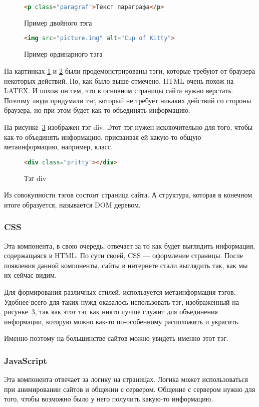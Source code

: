 \begin{figure}
    \begin{lstlisting}[language=html]
        <p class="paragraf">Текст параграфа</p>
    \end{lstlisting}
    \caption{Пример двойного тэга}
    \label{html-tag-2}
\end{figure}
\begin{figure}
    \begin{lstlisting}[language=html]
        <img src="picture.img" alt="Cup of Kitty">
    \end{lstlisting}
    \caption{Пример ординарного тэга}
    \label{html-tag-1}
\end{figure}

На картинках \ref{html-tag-2} и \ref{html-tag-1} были продемонстрированы тэги, которые требуют от браузера некоторых действий.
Но, как было выше отмечено, HTML очень похож на LATEX. И похож он тем, что в основном страницы сайта нужно верстать. 
Поэтому люди придумали тэг, который не требует никаких действий со стороны браузера, но при этом будет как-то объединять информацию.

На рисунке~\ref{html-div} изображен тэг div. Этот тэг нужен исключительно для того, чтобы как-то объединять информацию, присваивая ей какую-то общую метаинформацию, например, класс.

\begin{figure}
	\begin{lstlisting}[language=html]
	<div class="pritty"></div>
	\end{lstlisting}
	\caption{Тэг div}
	\label{html-div}
\end{figure}

Из совокупности тэгов состоит страница сайта. А структура, которая в конечном итоге образуется, называется DOM деревом.

\subsubsection{CSS}
Эта компонента, в свою очередь, отвечает за то как будет выглядить информация, содержащаяся в HTML. По сути своей, CSS --- оформление страницы.
После появления данной компоненты, сайты в интернете стали выглядить так, как мы их сейчас видим.

Для формирования различных стилей, используется метаинформация тэгов. 
Удобнее всего для таких нужд оказалось использовать тэг, изображенный на рисунке~\ref{html-div}, так как этот тэг как никто лучше служит для объединения информации, которую можно как-то по-особенному
расположить и украсить.

Именно поэтому на большинстве сайтов можно увидеть именно этот тэг.

\subsubsection{JavaScript} \label{js-ref}
Эта компонента отвечает за логику на страницах. Логика может использоваться при анимировании сайтов и общении с сервером. Общение с сервером нужно для того, чтобы возможно было у него получить какую-то информацию.


 
